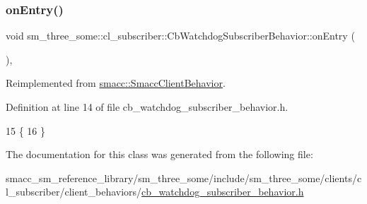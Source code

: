 \subsubsection{\texorpdfstring{on\+Entry()}{onEntry()}}
{\footnotesize\ttfamily void sm\+\_\+three\+\_\+some\+::cl\+\_\+subscriber\+::\+Cb\+Watchdog\+Subscriber\+Behavior\+::on\+Entry (\begin{DoxyParamCaption}{ }\end{DoxyParamCaption})\hspace{0.3cm}{\ttfamily [inline]}, {\ttfamily [virtual]}}



Reimplemented from \hyperlink{classsmacc_1_1SmaccClientBehavior_ad5d3e1f1697c3cfe66c94cadba948493}{smacc\+::\+Smacc\+Client\+Behavior}.



Definition at line 14 of file cb\+\_\+watchdog\+\_\+subscriber\+\_\+behavior.\+h.


\begin{DoxyCode}
15     \{
16     \}
\end{DoxyCode}


The documentation for this class was generated from the following file\+:\begin{DoxyCompactItemize}
\item 
smacc\+\_\+sm\+\_\+reference\+\_\+library/sm\+\_\+three\+\_\+some/include/sm\+\_\+three\+\_\+some/clients/cl\+\_\+subscriber/client\+\_\+behaviors/\hyperlink{sm__three__some_2include_2sm__three__some_2clients_2cl__subscriber_2client__behaviors_2cb__watchdog__subscriber__behavior_8h}{cb\+\_\+watchdog\+\_\+subscriber\+\_\+behavior.\+h}\end{DoxyCompactItemize}

